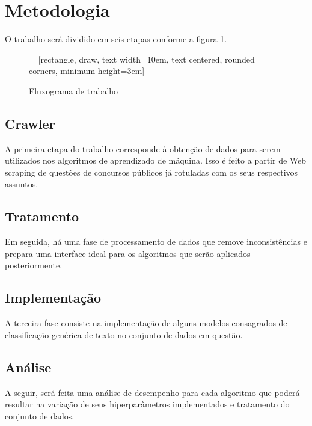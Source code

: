 \section{Metodologia}
\label{sec:metodology}
O trabalho será dividido em seis etapas conforme a figura \ref{fig:fluxogram}.

\begin{figure}[!ht]
  \centering
   = [rectangle, draw, text width=10em, text centered, rounded      corners, minimum height=3em]
  \caption{Fluxograma de trabalho}
  \label{fig:fluxogram}
\end{figure}
\subsection{Crawler}
A primeira etapa do trabalho corresponde à obtenção de dados para serem utilizados nos algoritmos de aprendizado de máquina. Isso é feito a partir de Web scraping de questões de concursos públicos já rotuladas com os seus respectivos assuntos.
\subsection{Tratamento}
Em seguida, há uma fase de processamento de dados que remove inconsistências e prepara uma interface ideal para os algoritmos que serão aplicados posteriormente.
\subsection{Implementação}
A terceira fase consiste na implementação de alguns modelos consagrados de classificação genérica de texto no conjunto de dados em questão.
\subsection{Análise}
A seguir, será feita uma análise de desempenho para cada algoritmo que poderá resultar na variação de seus hiperparâmetros implementados e tratamento do conjunto de dados.
